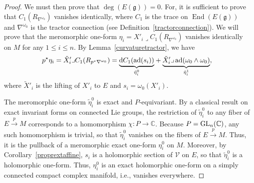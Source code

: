 \documentclass[10pt,a4paper]{amsart}
\numberwithin{equation}{section}
\begin{document}
\begin{proof}
We must then prove that $\deg (E(\mathfrak{g}))=0$. For, it is sufficient to prove that $C_1(R_{\nabla^{\omega_0}})$ vanishes identically, where $C_1$ is the trace on $\operatorname{End}(E(\mathfrak{g}))$ and $\nabla^{\omega_0}$ is the tractor connection (see Definition~\ref{tractorconnection}). We will prove that the meromorphic one-form $\eta_i = X'_i \lrcorner C_1(R_{\nabla^{\omega_0}})$ vanishes identically on $M$ for any $1\leq i\leq n$. By Lemma~\ref{curvaturetractor}, we have
 \begin{gather*}
 p^\star \eta_i = \tilde{X}'_i \lrcorner C_1(R_{p^\star \nabla^{\omega_0}}) = \underset{\tilde{\eta}_i^0}{\underbrace{{\rm d}C_1(\operatorname{ad}(s_i))}} + \underset{\tilde{\eta}^1_i}{\underbrace{\tilde{X}'_i \lrcorner \operatorname{ad}(\omega_0 \wedge \omega_0)}},\end{gather*}
 where $\tilde{X}'_i$ is the lifting of $X'_i$ to $E$ and $s_i = \omega_0(X'_i)$.

The meromorphic one-form $\tilde{\eta}^0_i$ is exact and $P$-equivariant. By a classical result on exact invariant forms on connected Lie groups, the restriction of $\tilde{\eta}^0_i$ to any fiber of $E\overset{p}{\longrightarrow} M$ corresponds to a homomorphism $\chi\colon P \longrightarrow \mathbb{C}$. Because $P={\rm GL}_n(\mathbb{C})$, any such homomorphism is trivial, so that $\tilde{\eta}^0_i$ vanishes on the fibers of $E\overset{p}{\longrightarrow} M$. Thus, it is the pullback of a meromorphic exact one-form $\eta^0_i$ on $M$. Moreover, by Corollary~\ref{proprextaffine}, $s_i$ is a holomorphic section of $\mathcal{V}$ on $E$, so that $\tilde{\eta}^0_i$ is a holomorphic one-form. Thus, $\eta^0_i$ is an exact holomorphic one-form on a simply connected compact complex manifold, i.e., vanishes everywhere.


\end{proof}
\end{document}
